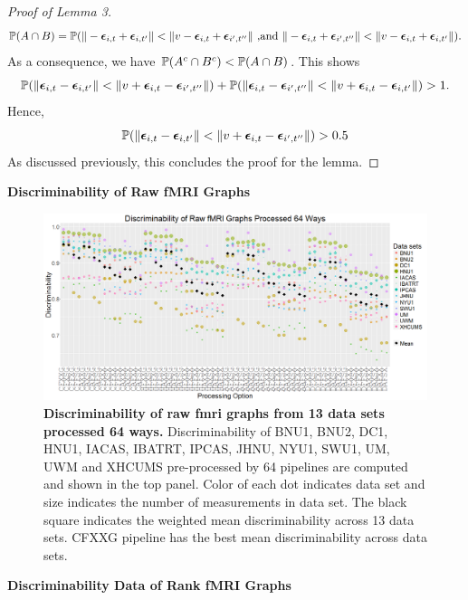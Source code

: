 \documentclass{article}
\begin{document}
\begin{proof}[Proof of Lemma 3]
	\[\mathbb{P}(A \cap B ) = 
	\mathbb{P}(\|-\boldsymbol{\epsilon}_{i,t}+\boldsymbol{\epsilon}_{i,t'}\| < \|v-\boldsymbol{\epsilon}_{i,t} + \boldsymbol{\epsilon}_{i',t''}\| \text{ ,and } \|-\boldsymbol{\epsilon}_{i,t}+\boldsymbol{\epsilon}_{i',t''}\| < \|v-\boldsymbol{\epsilon}_{i,t} + \boldsymbol{\epsilon}_{i,t'}\|) .\] 
	As a consequence, we have $ \mathbb{P}(A^c \cap B^c) < \mathbb{P}(A \cap B ) $. This shows 
	\[\mathbb{P}(\|\boldsymbol{\epsilon}_{i,t}-\boldsymbol{\epsilon}_{i,t'}\| < \|v+\boldsymbol{\epsilon}_{i,t} - \boldsymbol{\epsilon}_{i',t''}\|) +  \mathbb{P}(\|\boldsymbol{\epsilon}_{i,t}-\boldsymbol{\epsilon}_{i',t''}\| < \|v+\boldsymbol{\epsilon}_{i,t} - \boldsymbol{\epsilon}_{i,t'}\|) > 1 .\]
	Hence,
	\[\mathbb{P}(\|\boldsymbol{\epsilon}_{i,t}-\boldsymbol{\epsilon}_{i,t'}\| < \|v+\boldsymbol{\epsilon}_{i,t} - \boldsymbol{\epsilon}_{i',t''}\|) > 0.5\]
	As discussed previously, this concludes the proof for the lemma.
\end{proof}

\noindent\bf{Discriminability of Raw fMRI Graphs}
\begin{figure}[H]
	\includegraphics[width=\linewidth]{../Figs/fmri_raw.png}
	\caption{{\bf Discriminability of raw fmri graphs from 13 data sets processed 64 ways.}  Discriminability of BNU1, BNU2, DC1, HNU1, IACAS, IBATRT, IPCAS, JHNU, NYU1, SWU1, UM, UWM and XHCUMS pre-processed by 64 pipelines are computed and shown in the top panel. Color of each dot indicates data set and size indicates the number of measurements in data set. The black square indicates the weighted mean discriminability across 13 data sets. CFXXG pipeline has the best mean discriminability across data sets.}
	\label{fig:raw}
\end{figure}

\noindent\bf{Discriminability Data of Rank fMRI Graphs}
\begin{table}

\caption{Discriminability of $13$ data sets and their weighted means processed by 64 pipelines. }
\end{table}
\end{document}

